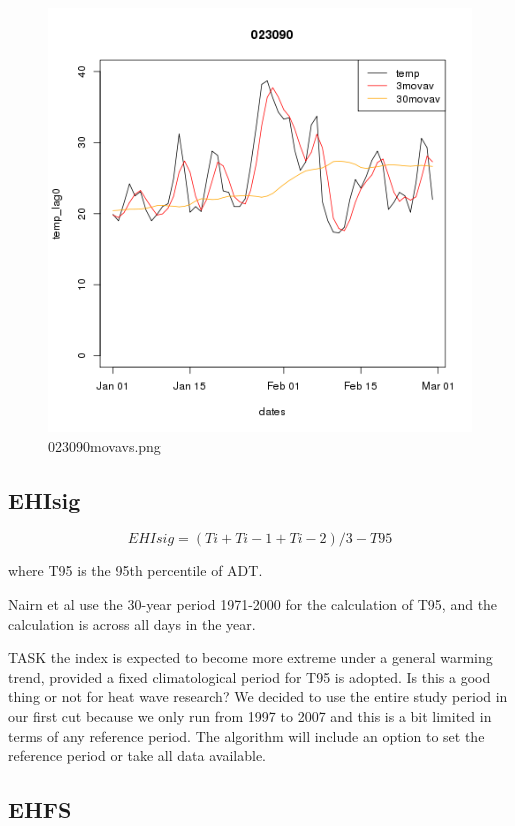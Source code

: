 \documentclass[a4paper]{article}
\begin{document}
\begin{figure}[!h]
\centering
\includegraphics[width=\textwidth]{023090movavs.png}
\caption{023090movavs.png}
\label{fig:023090movavs.png}
\end{figure}
\clearpage

\subsection{EHI{sig}}
$$EHI{sig} = (Ti + T{i}-1 + T{i}-2)/3 - T{95}$$

 where T{95} is the 95th percentile of ADT. 
 
 Nairn et al use the 30-year period 1971-2000 for the calculation of T{95}, and the calculation is across all days in the year.  
 
 TASK the index is expected to become more extreme under a general warming trend, provided a fixed climatological period for T{95} is adopted.  Is this a good thing or not for heat wave research?
 We decided to use the entire study period in our first cut because we only run from 1997 to 2007 and this is a bit limited in terms of any reference period.
 The algorithm will include an option to set the reference period or take all data available.
 
 

\subsection{EHFS}
\end{document}
